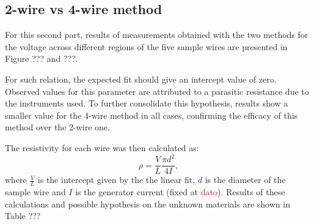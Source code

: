 \documentclass[a4paper,12pt]{article}
\begin{document}
\subsection*{2-wire vs 4-wire method}
For this second part, results of measurements obtained with the two methods for the voltage across different regions of the five sample wires are presented in Figure ??? and ???.\par 
For such relation, the expected fit should give an intercept value of zero. Observed values for this parameter are attributed to a parasitic resistance due to the instruments used. To further consolidate this hypothesis, results show a 
smaller value for the 4-wire method in all cases, confirming the efficacy of this method over the 2-wire one. \par
The resistivity for each wire was then calculated as: 
\begin{equation}
    \rho = \frac{V}{L} \frac{\pi d^2}{4I},
\end{equation}
where $\frac{V}{L}$ is the intercept given by the the linear fit, $d$ is the diameter of the sample wire and $I$ is the generator current (fixed at \textcolor{red}{dato}).
Results of these calculations and possible hypothesis on the unknown materials are shown in Table ???
\end{document}
